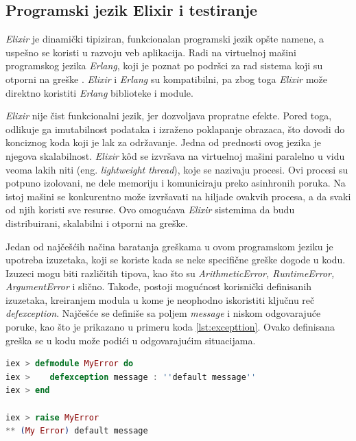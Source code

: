 \documentclass[12pt,oneside]{memoir}
\begin{document}
\subsection{Programski jezik Elixir i testiranje}
\par \emph{Elixir} je dinamički tipiziran, funkcionalan programski jezik opšte namene, a uspešno se koristi u razvoju veb aplikacija. Radi na virtuelnoj mašini programskog jezika \emph{Erlang}, koji je poznat po podršci za rad sistema koji su otporni na greške \cite{elixir-lang-official, erlang}. \emph{Elixir} i \emph{Erlang} su kompatibilni, pa zbog toga \emph{Elixir} može direktno koristiti \emph{Erlang} biblioteke i module. 
\par \emph{Elixir} nije čist funkcionalni jezik, jer dozvoljava propratne efekte. Pored toga, odlikuje ga imutabilnost podataka i izraženo poklapanje obrazaca, što dovodi do konciznog koda koji je lak za održavanje. Jedna od prednosti ovog jezika je njegova skalabilnost. \emph{Elixir} k\^{o}d se izvršava na virtuelnoj mašini paralelno u vidu veoma lakih niti (eng. \emph{lightweight thread}), koje se nazivaju procesi. Ovi procesi su potpuno izolovani, ne dele memoriju i komuniciraju preko asinhronih poruka. Na istoj mašini se konkurentno može izvršavati na hiljade ovakvih procesa, a da svaki od njih koristi sve resurse. Ovo omogućava \emph{Elixir} sistemima da budu distribuirani, skalabilni i otporni na greške. 
\par Jedan od najčešćih načina baratanja greškama u ovom programskom jeziku je upotreba izuzetaka, koji se koriste kada se neke specifične greške dogode u kodu. Izuzeci mogu biti različitih tipova, kao što su \emph{ArithmeticError, RuntimeError, ArgumentError} i slično. Takođe, postoji mogućnost korisnički definisanih izuzetaka, kreiranjem modula u kome je neophodno iskoristiti ključnu reč \emph{defexception}. Najčešće se definiše sa poljem \emph{message} i niskom odgovarajuće poruke, kao što je prikazano u primeru koda \ref{lst:excepttion}. Ovako definisana greška se u kodu može podići u odgovarajućim situacijama. \\

\begin{minipage}{\linewidth}
\begin{lstlisting}[language=elixir, basicstyle=\small, caption={Definicija izuzetka u programskom jeziku \emph{Elixir}},captionpos=b, label={lst:excepttion}]
iex > defmodule MyError do 
iex > 	 defexception message : ''default message''
iex > end 

iex > raise MyError
** (My Error) default message
\end{lstlisting}
\end{minipage}
\end{document}
